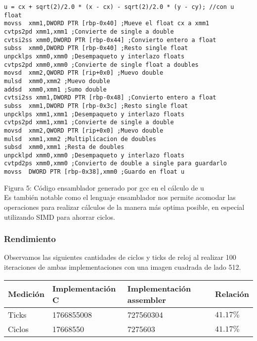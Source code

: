 \begin{lstlisting}
u = cx + sqrt(2)/2.0 * (x - cx) - sqrt(2)/2.0 * (y - cy); //con u float
movss  xmm1,DWORD PTR [rbp-0x40] ;Mueve el float cx a xmm1
cvtps2pd xmm1,xmm1 ;Convierte de single a double
cvtsi2ss xmm0,DWORD PTR [rbp-0x44] ;Convierto entero a float
subss  xmm0,DWORD PTR [rbp-0x40] ;Resto single float
unpcklps xmm0,xmm0 ;Desempaqueto y interlazo floats
cvtps2pd xmm0,xmm0 ;Convierte de single float a doubles
movsd  xmm2,QWORD PTR [rip+0x0] ;Muevo double
mulsd  xmm0,xmm2 ;Muevo double
addsd  xmm0,xmm1 ;Sumo double
cvtsi2ss xmm1,DWORD PTR [rbp-0x48] ;Convierto entero a float
subss  xmm1,DWORD PTR [rbp-0x3c] ;Resto single float
unpcklps xmm1,xmm1 ;Desempaqueto y interlazo floats
cvtps2pd xmm1,xmm1 ;Convierte de single a double
movsd  xmm2,QWORD PTR [rip+0x0] ;Muevo double
mulsd  xmm1,xmm2 ;Multiplicacion de doubles
subsd  xmm0,xmm1 ;Resta de doubles
unpcklpd xmm0,xmm0 ;Desempaqueto y interlazo floats
cvtpd2ps xmm0,xmm0 ;Convierto de double a single para guardarlo
movss  DWORD PTR [rbp-0x38],xmm0 ;Guardo en float u
\end{lstlisting}

Figura 5: Código ensamblador generado por gcc en el cálculo de u \\

Es también notable como el lenguaje ensamblador nos permite acomodar las operaciones para realizar cálculos de la manera más optima posible, en especial utilizando SIMD para ahorrar ciclos.

\subsubsection{Rendimiento}
Observamos las siguientes cantidades de ciclos y ticks de reloj al realizar 100 iteraciones de ambas implementaciones con una imagen cuadrada de lado 512.
\begin{center}
    \begin{tabular}{|l|l|l|l|}
        \hline
        Medición & Implementación C & Implementación assembler & Relación \\
        \hline
        Ticks    & 1766855008      & 727560304               & $41.17\%$ \\
        Ciclos   & 17668550       & 7275603                & $41.17\%$ \\
        \hline
    \end{tabular}
\end{center}